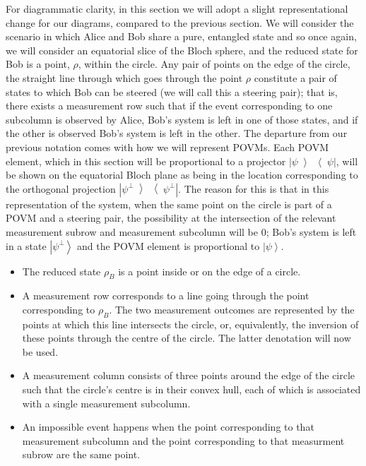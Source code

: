 \documentclass[reprint]{revtex4-1}
\theoremstyle{definition}
\newcommand{\ket}[1]{{\left\vert{#1}\right\rangle}}
\newcommand{\ketbra}[1]{{\left| #1 \middle>\middle< #1 \right|}}
\begin{document}
For diagrammatic clarity, in this section we will adopt a slight representational change for our diagrams, compared to the previous section. We will consider the scenario in which Alice and Bob share a pure, entangled state and so once again, we will consider an equatorial slice of the Bloch sphere, and the reduced state for Bob is a point, $\rho$, within the circle. Any pair of points on the edge of the circle, the straight line through which goes through the point $\rho$ constitute a pair of states to which Bob can be steered (we will call this a steering pair); that is, there exists a measurement row such that if the event corresponding to one subcolumn is observed by Alice, Bob's system is left in one of those states, and if the other is observed Bob's system is left in the other. The departure from our previous notation comes with how we will represent POVMs. Each POVM element, which in this section will be proportional to a projector $\ketbra{\psi}$, will be shown on the equatorial Bloch plane as being in the location corresponding to the orthogonal projection $\ketbra{\psi^\perp}$. The reason for this is that in this representation of the system, when the same point on the circle is part of a POVM and a steering pair, the possibility at the intersection of the relevant measurement subrow and measurement subcolumn will be 0; Bob's system is left in a state $\ket{\psi^\perp}$ and the POVM element is proportional to $\ket{\psi}$.



\begin{itemize}
\item The reduced state $\rho_B$ is a point inside or on the edge of a circle.

\item A measurement row corresponds to a line going through the point corresponding to $\rho_B$. The two measurement outcomes are represented by the points at which this line intersects the circle, or, equivalently, the inversion of these points through the centre of the circle. The latter denotation will now be used.

\item A measurement column consists of three points around the edge of the circle such that the circle's centre is in their convex hull, each of which is associated with a single measurement subcolumn.

\item An impossible event happens when the point corresponding to that measurement subcolumn and the point corresponding to that measurment subrow are the same point. 
\end{itemize}
\end{document}
